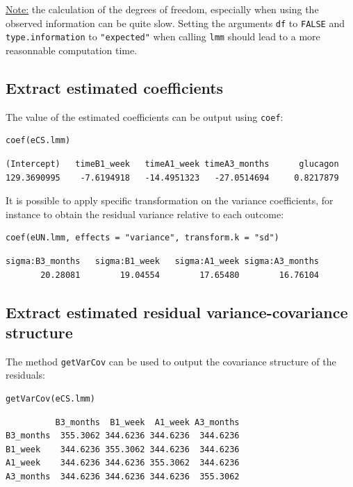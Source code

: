 \documentclass[12pt]{article}
\begin{document}
\uline{Note:} the calculation of the degrees of freedom, especially when
using the observed information can be quite slow. Setting the
arguments \texttt{df} to \texttt{FALSE} and \texttt{type.information} to \texttt{"expected"} when
calling \texttt{lmm} should lead to a more reasonnable computation time.

\subsection{Extract estimated coefficients}
\label{sec:org3c146b7}
The value of the estimated coefficients can be output using \texttt{coef}:
\lstset{language=r,label= ,caption= ,captionpos=b,numbers=none}
\begin{lstlisting}
coef(eCS.lmm)
\end{lstlisting}

\begin{verbatim}
(Intercept)   timeB1_week   timeA1_week timeA3_months      glucagon 
129.3690995    -7.6194918   -14.4951323   -27.0514694     0.8217879
\end{verbatim}


It is possible to apply specific transformation on the variance
coefficients, for instance to obtain the residual variance relative to
each outcome:
\lstset{language=r,label= ,caption= ,captionpos=b,numbers=none}
\begin{lstlisting}
coef(eUN.lmm, effects = "variance", transform.k = "sd")
\end{lstlisting}

\begin{verbatim}
sigma:B3_months   sigma:B1_week   sigma:A1_week sigma:A3_months 
       20.28081        19.04554        17.65480        16.76104
\end{verbatim}

\subsection{Extract estimated residual variance-covariance structure}
\label{sec:orgef34b67}

The method \texttt{getVarCov} can be used to output the covariance structure of the residuals:
\lstset{language=r,label= ,caption= ,captionpos=b,numbers=none}
\begin{lstlisting}
getVarCov(eCS.lmm)
\end{lstlisting}

\begin{verbatim}
          B3_months  B1_week  A1_week A3_months
B3_months  355.3062 344.6236 344.6236  344.6236
B1_week    344.6236 355.3062 344.6236  344.6236
A1_week    344.6236 344.6236 355.3062  344.6236
A3_months  344.6236 344.6236 344.6236  355.3062
\end{verbatim}
\end{document}
